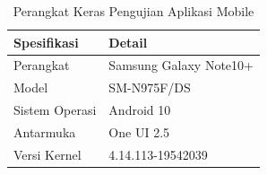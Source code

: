 \begin{table}[h]
\centering
\caption{Perangkat Keras Pengujian Aplikasi Mobile}
\label{tab:hw-test}
\begin{tabular}{|p{5cm}|p{8cm}|}
\hline
\textbf{Spesifikasi} & \textbf{Detail} \\ \hline
Perangkat            & Samsung Galaxy Note10+ \\ \hline
Model                & SM-N975F/DS \\ \hline
Sistem Operasi       & Android 10 \\ \hline
Antarmuka            & One UI 2.5 \\ \hline
Versi Kernel         & 4.14.113-19542039 \\ \hline
\end{tabular}
\end{table}